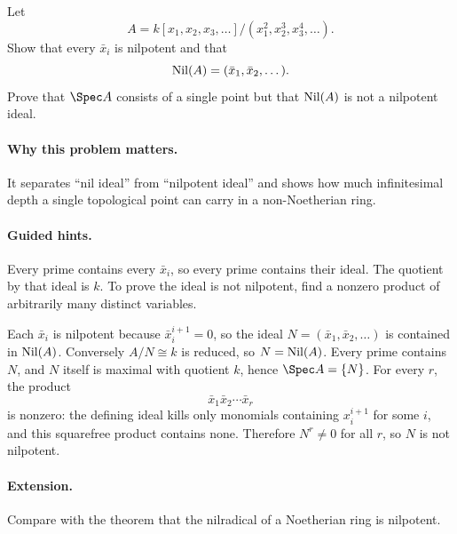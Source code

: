 \begin{problem}
Let
\[
A=k[x_1,x_2,x_3,\dots]/(x_1^2,x_2^3,x_3^4,\dots).
\]
Show that every $\bar x_i$ is nilpotent and that
\[
\operatorname{Nil}(A)=(\bar x_1,\bar x_2,\dots).
\]
Prove that $\Spec A$ consists of a single point but that $\operatorname{Nil}(A)$ is not a nilpotent ideal.
\end{problem}
\paragraph{Why this problem matters.}
It separates ``nil ideal'' from ``nilpotent ideal'' and shows how much infinitesimal depth a
single topological point can carry in a non-Noetherian ring.
\paragraph{Guided hints.}
Every prime contains every $\bar x_i$, so every prime contains their ideal.  The quotient by
that ideal is $k$.  To prove the ideal is not nilpotent, find a nonzero product of arbitrarily
many distinct variables.
\begin{solution}
Each $\bar x_i$ is nilpotent because $\bar x_i^{i+1}=0$, so the ideal
$N=(\bar x_1,\bar x_2,\dots)$ is contained in $\operatorname{Nil}(A)$.  Conversely $A/N\cong k$ is
reduced, so $N=\operatorname{Nil}(A)$.  Every prime contains $N$, and $N$ itself is maximal with quotient
$k$, hence $\Spec A=\{N\}$.
For every $r$, the product
\[
\bar x_1\bar x_2\cdots\bar x_r
\]
is nonzero: the defining ideal kills only monomials containing $x_i^{i+1}$ for some $i$,
and this squarefree product contains none.  Therefore $N^r\ne0$ for all $r$, so $N$ is not
nilpotent.
\end{solution}
\paragraph{Extension.}
Compare with the theorem that the nilradical of a Noetherian ring is nilpotent.
